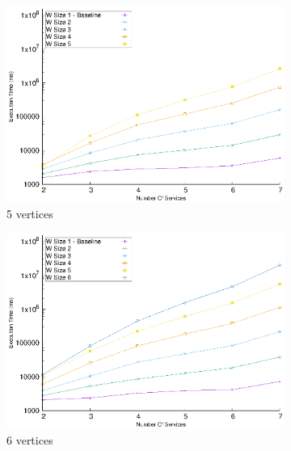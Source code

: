 \begin{figure}[!t]
\begin{subfigure}{0.45\textwidth}
        \includegraphics[width=\textwidth]{Images/graphs/window_time_performance_qualitative_n7_s7_50_80_n5}
        \caption{5 vertices}
        \label{fig:time_window_perce_wide_5n}
      \end{subfigure}
      \hfill
      \begin{subfigure}{0.45\textwidth}
        \includegraphics[width=\textwidth]{Images/graphs/window_time_performance_qualitative_n7_s7_50_80_n6}
        \caption{6 vertices}
        \label{fig:time_window_perce_wide_6n}
      \end{subfigure}
      \begin{subfigure}{0.45\textwidth}

\end{subfigure}
\end{figure}
